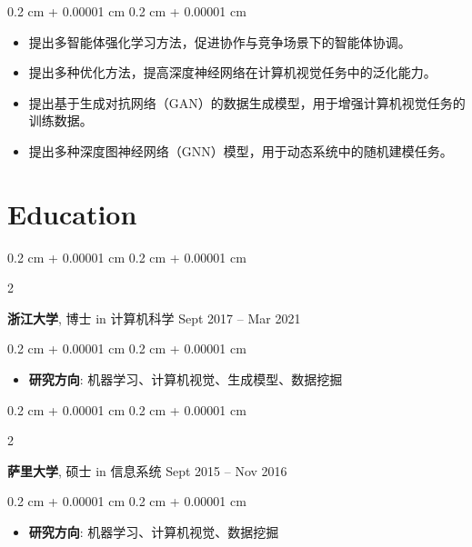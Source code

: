 \documentclass[10pt, letterpaper]{article}
\newenvironment{highlights}{
    \begin{itemize}[
        topsep=0.10 cm,
        parsep=0.10 cm,
        partopsep=0pt,
        itemsep=0pt,
        leftmargin=0.4 cm + 10pt
    ]
}{
    \end{itemize}
} %
\newenvironment{onecolentry}{
    \begin{adjustwidth}{
        0.2 cm + 0.00001 cm
    }{
        0.2 cm + 0.00001 cm
    }
}{
    \end{adjustwidth}
} %
\newenvironment{twocolentry}[2][]{
    \onecolentry
    \def\secondColumn{#2}
    \setcolumnwidth{\fill, 4.5 cm}
    \begin{paracol}{2}
}{
    \switchcolumn \raggedleft \secondColumn
    \end{paracol}
    \endonecolentry
} %
\begin{document}
        \vspace{0.10 cm}
        \begin{onecolentry}
            \begin{highlights}
                \item 提出多智能体强化学习方法，促进协作与竞争场景下的智能体协调。
                \item 提出多种优化方法，提高深度神经网络在计算机视觉任务中的泛化能力。
                \item 提出基于生成对抗网络（GAN）的数据生成模型，用于增强计算机视觉任务的训练数据。
                \item 提出多种深度图神经网络（GNN）模型，用于动态系统中的随机建模任务。
            \end{highlights}
        \end{onecolentry}



    
    \section{Education}



        
        \begin{twocolentry}{
            Sept 2017 – Mar 2021
        }
            \textbf{浙江大学}, 博士 in 计算机科学\end{twocolentry}

        \vspace{0.10 cm}
        \begin{onecolentry}
            \begin{highlights}
                \item \textbf{研究方向}: 机器学习、计算机视觉、生成模型、数据挖掘
            \end{highlights}
        \end{onecolentry}


        \vspace{0.2 cm}

        \begin{twocolentry}{
            Sept 2015 – Nov 2016
        }
            \textbf{萨里大学}, 硕士 in 信息系统\end{twocolentry}

        \vspace{0.10 cm}
        \begin{onecolentry}
            \begin{highlights}
                \item \textbf{研究方向}: 机器学习、计算机视觉、数据挖掘
            \end{highlights}
        \end{onecolentry}
\end{document}

